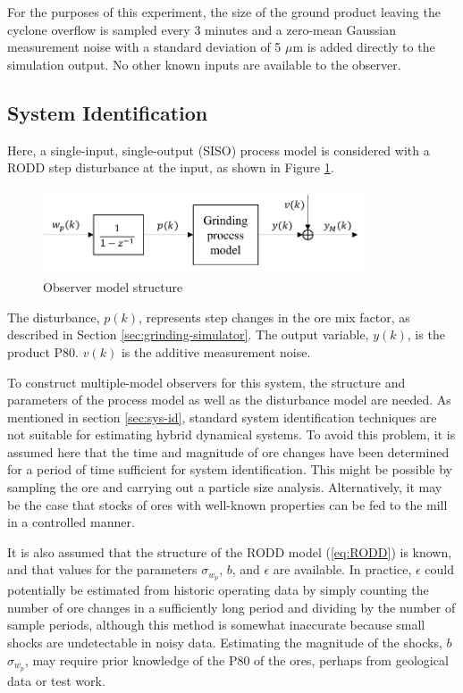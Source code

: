 For the purposes of this experiment, the size of the ground product leaving the cyclone overflow is sampled every 3 minutes and a zero-mean Gaussian measurement noise with a standard deviation of 5 $\mu\text{m}$ is added directly to the simulation output. No other known inputs are available to the observer.

\subsection{System Identification} \label{sec:grind1-sysid}

Here, a single-input, single-output (SISO) process model is considered with a RODD step disturbance at the input, as shown in Figure \ref{fig:grind1_obs_model}.
\begin{figure}[ht]
	\centering
	\includegraphics[width=9.5cm]{images/grind1-obs-model-diag.pdf}
	\caption{Observer model structure}
	\label{fig:grind1_obs_model}
\end{figure}

The disturbance, $p(k)$, represents step changes in the ore mix factor, as described in Section \ref{sec:grinding-simulator}. The output variable, $y(k)$, is the product P80. $v(k)$ is the additive measurement noise.

To construct multiple-model observers for this system, the structure and parameters of the process model as well as the disturbance model are needed. As mentioned in section \ref{sec:sys-id}, standard system identification techniques are not suitable for estimating hybrid dynamical systems. To avoid this problem, it is assumed here that the time and magnitude of ore changes have been determined for a period of time sufficient for system identification. This might be possible by sampling the ore and carrying out a particle size analysis. Alternatively, it may be the case that stocks of ores with well-known properties can be fed to the mill in a controlled manner.

It is also assumed that the structure of the RODD model (\ref{eq:RODD}) is known, and that values for the parameters $\sigma_{w_p}$, $b$, and $\epsilon$ are available. In practice, $\epsilon$ could potentially be estimated from historic operating data by simply counting the number of ore changes in a sufficiently long period and dividing by the number of sample periods, although this method is somewhat inaccurate because small shocks are undetectable in noisy data. Estimating the magnitude of the shocks, $b$$\sigma_{w_p}$, may require prior knowledge of the P80 of the ores, perhaps from geological data or test work.

